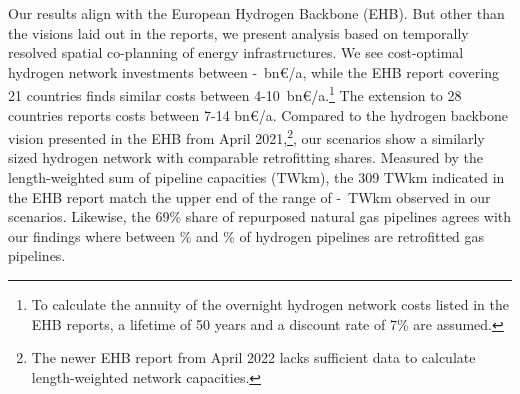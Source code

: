Our results align with the European Hydrogen Backbone
(EHB).\cite{gasforclimateEuropeanHydrogen2020,gasforclimateExtendingEuropean2021,gasforclimateEuropeanHydrogen2021,gasforclimateEuropeanHydrogen2022}
But other than the visions laid out in the reports, we present analysis based on
temporally resolved spatial co-planning of energy infrastructures. We see
cost-optimal hydrogen network investments between
\minhycost-\maxhycost~bn\euro/a, while the EHB report covering 21 countries
finds similar costs between
4-10~bn\euro/a.\cite{gasforclimateExtendingEuropean2021}\footnote{To calculate
the annuity of the overnight hydrogen network costs listed in the EHB reports, a
lifetime of 50 years and a discount rate of 7\% are assumed.} The extension to
28 countries reports costs between 7-14
bn\euro/a.\cite{gasforclimateEuropeanHydrogen2022} Compared to the hydrogen
backbone vision presented in the EHB from April
2021,\cite{gasforclimateExtendingEuropean2021}\footnote{The newer EHB report
from April 2022 \cite{gasforclimateEuropeanHydrogen2022} lacks sufficient data
to calculate length-weighted network capacities.}, our scenarios show a
similarly sized hydrogen network with comparable retrofitting shares. Measured
by the length-weighted sum of pipeline capacities (TWkm), the 309 TWkm indicated
in the EHB report match the upper end of the range of
\mintwkmhydrogen-\maxtwkmhydrogen~TWkm observed in our scenarios. Likewise, the
69\% share of repurposed natural gas pipelines
\cite{gasforclimateExtendingEuropean2021} agrees with our findings where between
\minretroshare\% and \maxretroshare\% of hydrogen pipelines are retrofitted gas
pipelines.




